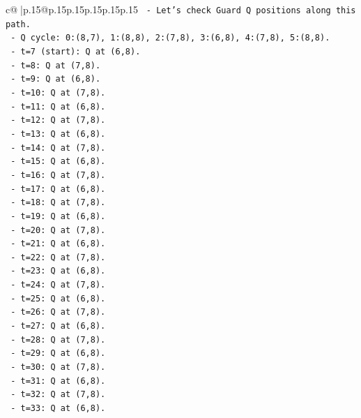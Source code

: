 \documentclass{article}
\begin{document}
{\begin{supertabular}{c@{$\;$}|p{.15\linewidth}@{}p{.15\linewidth}p{.15\linewidth}p{.15\linewidth}p{.15\linewidth}p{.15\linewidth}}
{{{\texttt{            {-}   Let's check Guard Q positions along this path.} \\
\texttt{            {-}   Q cycle: 0:(8,7), 1:(8,8), 2:(7,8), 3:(6,8), 4:(7,8), 5:(8,8).} \\
\texttt{            {-}   t=7 (start): Q at (6,8).} \\
\texttt{            {-}   t=8: Q at (7,8).} \\
\texttt{            {-}   t=9: Q at (6,8).} \\
\texttt{            {-}   t=10: Q at (7,8).} \\
\texttt{            {-}   t=11: Q at (6,8).} \\
\texttt{            {-}   t=12: Q at (7,8).} \\
\texttt{            {-}   t=13: Q at (6,8).} \\
\texttt{            {-}   t=14: Q at (7,8).} \\
\texttt{            {-}   t=15: Q at (6,8).} \\
\texttt{            {-}   t=16: Q at (7,8).} \\
\texttt{            {-}   t=17: Q at (6,8).} \\
\texttt{            {-}   t=18: Q at (7,8).} \\
\texttt{            {-}   t=19: Q at (6,8).} \\
\texttt{            {-}   t=20: Q at (7,8).} \\
\texttt{            {-}   t=21: Q at (6,8).} \\
\texttt{            {-}   t=22: Q at (7,8).} \\
\texttt{            {-}   t=23: Q at (6,8).} \\
\texttt{            {-}   t=24: Q at (7,8).} \\
\texttt{            {-}   t=25: Q at (6,8).} \\
\texttt{            {-}   t=26: Q at (7,8).} \\
\texttt{            {-}   t=27: Q at (6,8).} \\
\texttt{            {-}   t=28: Q at (7,8).} \\
\texttt{            {-}   t=29: Q at (6,8).} \\
\texttt{            {-}   t=30: Q at (7,8).} \\
\texttt{            {-}   t=31: Q at (6,8).} \\
\texttt{            {-}   t=32: Q at (7,8).} \\
\texttt{            {-}   t=33: Q at (6,8).} \\
}}}
\end{supertabular}}
\end{document}
